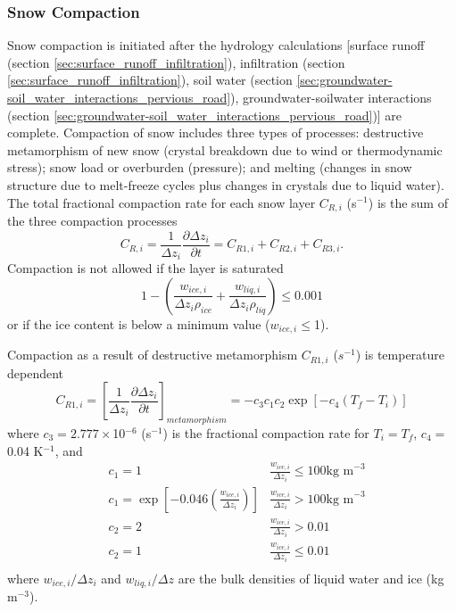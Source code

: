 \documentclass[12pt,authoryear]{elsarticle}
\numberwithin{equation}{section} %
\begin{document}
\subsubsection{Snow Compaction}
\label{sec:snow_compaction}
%
Snow compaction is initiated after the hydrology calculations [surface runoff (section \ref{sec:surface_runoff_infiltration}), infiltration (section \ref{sec:surface_runoff_infiltration}), soil water (section \ref{sec:groundwater-soil_water_interactions_pervious_road}), groundwater-soilwater interactions (section \ref{sec:groundwater-soil_water_interactions_pervious_road})] are complete. Compaction of snow includes three types of processes: destructive metamorphism of new snow (crystal breakdown due to wind or thermodynamic stress); snow load or overburden (pressure); and melting (changes in snow structure due to melt-freeze cycles plus changes in crystals due to liquid water). The total fractional compaction rate for each snow layer $C_{R,i}$ (s$^{-1}$) is the sum of the three compaction processes
\begin{equation}
C_{R,i}=\frac{1}{\Delta z_{i}}\frac{\partial \Delta z_{i}}{\partial t} = C_{R1,i}+C_{R2,i}+C_{R3,i}.
\end{equation}
Compaction is not allowed if the layer is saturated
\begin{equation}
1-\left(\frac{w_{ice,i}}{\Delta z_{i}\rho_{ice}}+\frac{w_{liq,i}}{\Delta z_{i}\rho_{liq}}\right) \leq 0.001
\end{equation}
or if the ice content is below a minimum value ($w_{ice,i}\leq$1).

Compaction as a result of destructive metamorphism $C_{R1,i}$ ($s^{-1}$) is temperature dependent \citep{andersonPointEnergyMass1976}
\begin{equation}
C_{R1,i} = \left[\frac{1}{\Delta z_{i}}\frac{\partial \Delta z_{i}}{\partial t}\right]_{metamorphism} = -c_{3}c_{1}c_{2}\exp[-c_{4}(T_{f}-T_{i})]
\end{equation}
where $c_{3}=2.777\times$10$^{-6}$ (s$^{-1}$) is the fractional compaction rate for $T_{i}=T_{f}$, $c_{4}=$0.04 K$^{-1}$, and
\begin{equation}
\begin{aligned}
& c_{1}=1 & \frac{w_{ice,i}}{\Delta z_{i}} \leq 100 \textrm{kg m}^{-3}\\
& c_{1}=\exp\left[-0.046 \left(\frac{w_{ice,i}}{\Delta z_{i}}\right)\right] & \frac{w_{ice,i}}{\Delta z_{i}} >100 \textrm{kg m}^{-3}\\
& c_{2}=2 & \frac{w_{ice,i}}{\Delta z_{i}}>0.01 \\
& c_{2}=1 & \frac{w_{ice,i}}{\Delta z_{i}}\leq0.01 \\
\end{aligned}
\end{equation}
where $w_{ice,i}/\Delta z_{i}$ and $w_{liq,i}/\Delta z$ are the bulk densities of liquid water and ice (kg m$^{-3}$).
\end{document}
